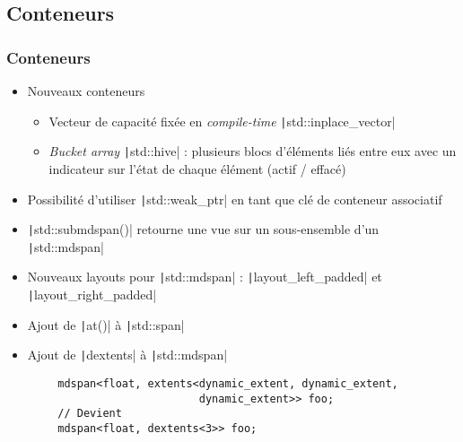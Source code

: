 \documentclass[C++.tex]{subfiles}
\begin{document}
\subsection*{Conteneurs}
\begin{frame}[fragile]
	\frametitle{Conteneurs}
	\begin{itemize}
		\item Nouveaux conteneurs
		\begin{itemize}
			\item Vecteur de capacité fixée en \textit{compile-time} \texttt|std::inplace_vector|


			\item \textit{Bucket array} \texttt|std::hive| : plusieurs blocs d'éléments liés entre eux avec un indicateur sur l'état de chaque élément (actif / effacé)

		\end{itemize}
		\item Possibilité d'utiliser \texttt|std::weak_ptr| en tant que clé de conteneur associatif
		\item \texttt|std::submdspan()| retourne une vue sur un sous-ensemble d'un \texttt|std::mdspan|
		\item Nouveaux layouts pour \texttt|std::mdspan| : \texttt|layout_left_padded| et \texttt|layout_right_padded|
		\item Ajout de \texttt|at()| à \texttt|std::span|
		\item Ajout de \texttt|dextents| à \texttt|std::mdspan|
	\end{itemize}

	\begin{verbatim}
		mdspan<float, extents<dynamic_extent, dynamic_extent,
		                      dynamic_extent>> foo;
		// Devient
		mdspan<float, dextents<3>> foo;
	\end{verbatim}

\end{frame}
\end{document}
